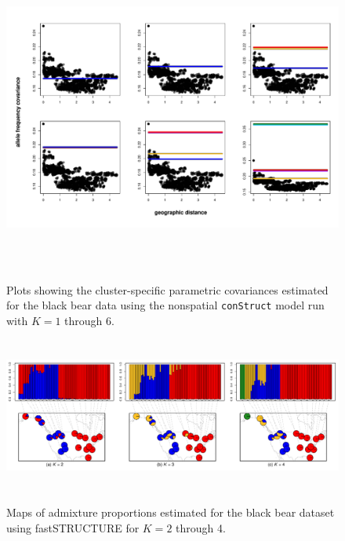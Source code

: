 \documentclass[12pt]{article}
\begin{document}
\begin{figure}
	\centering
		{\includegraphics[width=6in,height=4in]{figs/bears/bear_nsp_layer_covs.pdf}}
	\caption{
	Plots showing the cluster-specific parametric covariances 
	estimated for the black bear data using 
	the nonspatial \texttt{conStruct} model run with $K=1$ through 6.
    }\label{bear_nsp_layer_covs}
\end{figure}

\begin{figure}
	\centering
		{\includegraphics[width=6in,height=2in]{figs/bears/bear_fastStr_results.pdf}}
	\caption{
	Maps of admixture proportions estimated for the black bear dataset 
	using fastSTRUCTURE \citep{fastStructure} for $K=2$ through 4.
    }\label{bear_fastStr}
\end{figure}

\newpage
\clearpage


\newpage
\end{document}
